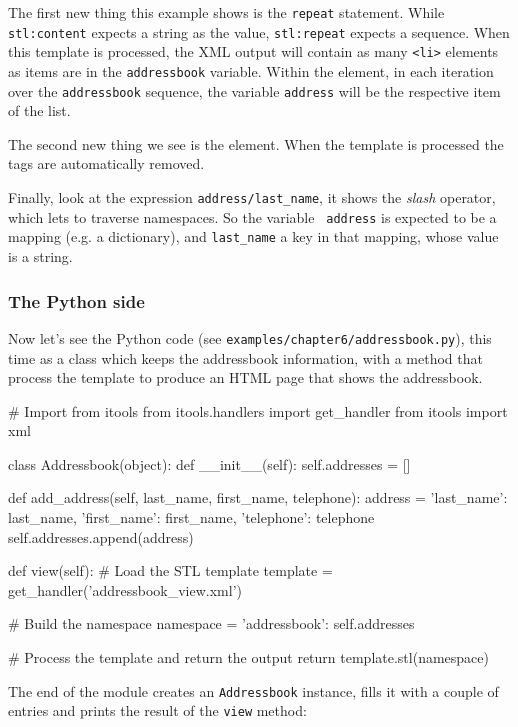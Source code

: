 The first new thing this example shows is the {\tt repeat} statement. While
{\tt stl:content} expects a string as the value, {\tt stl:repeat} expects
a sequence. When this template is processed, the XML output will contain as
many {\tt <li>} elements as items are in the {\tt addressbook} variable.
Within the element, in each iteration over the {\tt addressbook} sequence,
the variable {\tt address} will be the respective item of the list.

The second new thing we see is the {\tt <stl:block>} element. When the
template is processed the {\tt <stl:block>} tags are automatically
removed.

Finally, look at the expression {\tt address/last\_name}, it shows the {\em
slash} operator, which lets to traverse namespaces. So the variable {\tt
address} is expected to be a mapping (e.g. a dictionary), and {\tt last\_name}
a key in that mapping, whose value is a string.

\subsubsection{The Python side}

Now let's see the Python code (see {\tt examples/chapter6/addressbook.py}),
this time as a class which keeps the addressbook information, with a method
that process the template to produce an HTML page that shows the addressbook.

\begin{code}
    # Import from itools
    from itools.handlers import get_handler
    from itools import xml


    class Addressbook(object):
        def __init__(self):
            self.addresses = []


        def add_address(self, last_name, first_name, telephone):
            address = {'last_name': last_name,
                       'first_name': first_name,
                       'telephone': telephone}
            self.addresses.append(address)


        def view(self):
            # Load the STL template
            template = get_handler('addressbook_view.xml')

            # Build the namespace
            namespace = {'addressbook': self.addresses}

            # Process the template and return the output
            return template.stl(namespace)
\end{code}

The end of the module creates an {\tt Addressbook} instance, fills it with
a couple of entries and prints the result of the {\tt view} method:

